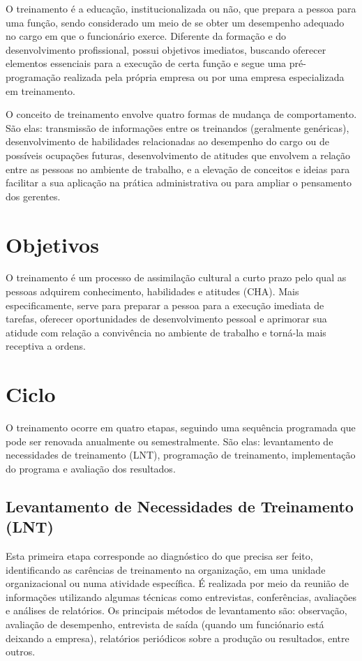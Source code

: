 \documentclass[12pt]{article}
\begin{document}
O treinamento é a educação, institucionalizada ou não, que prepara a pessoa para uma função, sendo considerado um meio de se obter um desempenho adequado no cargo em que o funcionário exerce. Diferente da formação e do desenvolvimento profissional, possui objetivos imediatos, buscando oferecer elementos essenciais para a execução de certa função e segue uma pré-programação realizada pela própria empresa ou por uma empresa especializada em treinamento.

O conceito de treinamento envolve quatro formas de mudança de comportamento. São elas: transmissão de informações entre os treinandos (geralmente genéricas), desenvolvimento de habilidades relacionadas ao desempenho do cargo ou de possíveis ocupações futuras, desenvolvimento de atitudes que envolvem a relação entre as pessoas no ambiente de trabalho, e a elevação de conceitos e ideias para facilitar a sua aplicação na prática administrativa ou para ampliar o pensamento dos gerentes.

\section{Objetivos}
O treinamento é um processo de assimilação cultural a curto prazo pelo qual as pessoas adquirem conhecimento, habilidades e atitudes (CHA). Mais especificamente, serve para preparar a pessoa para a execução imediata de tarefas, oferecer oportunidades de desenvolvimento pessoal e aprimorar sua atidude com relação a convivência no ambiente de trabalho e torná-la mais receptiva a ordens.

\section{Ciclo}
O treinamento ocorre em quatro etapas, seguindo uma sequência programada que pode ser renovada anualmente ou semestralmente. São elas: levantamento de necessidades de treinamento (LNT), programação de treinamento, implementação do programa e avaliação dos resultados.

\subsection{Levantamento de Necessidades de Treinamento (LNT)}
Esta primeira etapa corresponde ao diagnóstico do que precisa ser feito, identificando as carências de treinamento na organização, em uma unidade organizacional ou numa atividade específica. É realizada por meio da reunião de informações utilizando algumas técnicas como entrevistas, conferências, avaliações e análises de relatórios.
Os principais métodos de levantamento são: observação, avaliação de desempenho, entrevista de saída (quando um funciónario está deixando a empresa), relatórios periódicos sobre a produção ou resultados, entre outros.
\end{document}
